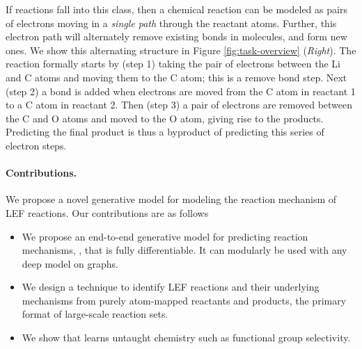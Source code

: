 If reactions fall into this class, then a chemical reaction can be modeled as pairs of electrons moving in a \emph{single path} through the reactant atoms. 
Further, this electron path will alternately remove existing bonds in molecules, and form new ones. We show this alternating structure in Figure \ref{fig:task-overview} (\emph{Right}). 
The reaction formally starts by (step 1) taking the pair of electrons between the Li and C atoms and moving them to the C atom; this is a remove bond step. 
Next (step 2) a bond is added when electrons are moved from the C atom in reactant 1 to a C atom in reactant 2.
Then (step 3) a pair of electrons are removed between the C and O atoms and moved to the O atom, giving rise to the products. 
Predicting the final product is thus a byproduct of predicting this series of electron steps.


\paragraph{Contributions.} We propose a novel generative model for modeling the reaction mechanism of LEF reactions. Our contributions are as follows
\begin{itemize}
\item We propose an end-to-end generative model for predicting reaction mechanisms, \ourModelR, that is fully differentiable. It can modularly be used with any deep model on graphs.
\item We design a technique to identify LEF reactions and their underlying mechanisms from purely atom-mapped reactants and products, the primary format of large-scale reaction sets.
\item We show that \ourModelR learns untaught chemistry such as functional group selectivity.
\end{itemize}


